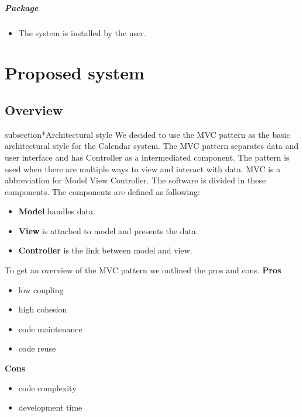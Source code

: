 \paragraph{Package}
\begin{itemize}
	\item The system is installed by the user.
\end{itemize}



\chapter*{Proposed system}

\section*{Overview}

subsection*{Architectural style}
\newline
 We decided to use the MVC pattern as the basic architectural style for the Calendar system.
\newline
\newline
The MVC pattern separates data and user interface and has Controller as a intermediated component. The pattern is used when there are multiple ways to view and interact with data.
\newline
\newline
MVC is a abbreviation for Model View Controller. The software is divided in these components. The components are defined as following:
\begin{itemize}
	\item \textbf{Model} handles data.
	\item \textbf{View} is attached to model and presents the data.
	\item \textbf{Controller} is the link between model and view. 
\end{itemize}
\bigskip


To get an overview of the MVC pattern we outlined the pros and cons.
\newline
\textbf{Pros}
\begin{itemize}
	\item low coupling
	\item high cohesion
	\item code maintenance
	\item code reuse
\end{itemize}
\textbf{Cons}
\begin{itemize}
	\item code complexity
	\item development time
\end{itemize}

